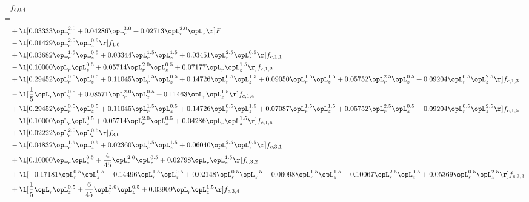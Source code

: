 \begin{alignat}{2} 
\label{eq:f_04_2} 
& f_{c,0,4} \nonumber \\ 
 = \\ 
& + \l[  0.03333 \opL_r^{2.0} +  0.04286 \opL_r^{3.0} +  0.02713 \opL_r^{2.0} \opL_z  \r] F \nonumber \\ 
& - \l[  0.01429 \opL_r^{2.0} \opL_z^{0.5}  \r] f_{1,0} \nonumber \\ 
& + \l[  0.03682 \opL_r^{1.5} \opL_z^{0.5} +  0.03344 \opL_r^{1.5} \opL_z^{1.5} +  0.03451 \opL_r^{2.5} \opL_z^{0.5}  \r] f_{c,1,1} \nonumber \\ 
& - \l[  0.10000 \opL_r \opL_z^{0.5} +  0.05714 \opL_r^{2.0} \opL_z^{0.5} +  0.07177 \opL_r \opL_z^{1.5}  \r] f_{c,1,2} \nonumber \\ 
& + \l[  0.29452 \opL_r^{0.5} \opL_z^{0.5} +  0.11045 \opL_r^{1.5} \opL_z^{0.5} +  0.14726 \opL_r^{0.5} \opL_z^{1.5} +  0.09050 \opL_r^{1.5} \opL_z^{1.5} +  0.05752 \opL_r^{2.5} \opL_z^{0.5} +  0.09204 \opL_r^{0.5} \opL_z^{2.5}  \r] f_{c,1,3} \nonumber \\ 
& - \l[ \frac{1}{5} \opL_r \opL_z^{0.5} +  0.08571 \opL_r^{2.0} \opL_z^{0.5} +  0.11463 \opL_r \opL_z^{1.5}  \r] f_{c,1,4} \nonumber \\ 
& + \l[  0.29452 \opL_r^{0.5} \opL_z^{0.5} +  0.11045 \opL_r^{1.5} \opL_z^{0.5} +  0.14726 \opL_r^{0.5} \opL_z^{1.5} +  0.07087 \opL_r^{1.5} \opL_z^{1.5} +  0.05752 \opL_r^{2.5} \opL_z^{0.5} +  0.09204 \opL_r^{0.5} \opL_z^{2.5}  \r] f_{c,1,5} \nonumber \\ 
& - \l[  0.10000 \opL_r \opL_z^{0.5} +  0.05714 \opL_r^{2.0} \opL_z^{0.5} +  0.04286 \opL_r \opL_z^{1.5}  \r] f_{c,1,6} \nonumber \\ 
& + \l[  0.02222 \opL_r^{2.0} \opL_z^{0.5}  \r] f_{3,0} \nonumber \\ 
& - \l[  0.04832 \opL_r^{1.5} \opL_z^{0.5} +  0.02360 \opL_r^{1.5} \opL_z^{1.5} +  0.06040 \opL_r^{2.5} \opL_z^{0.5}  \r] f_{c,3,1} \nonumber \\ 
& + \l[  0.10000 \opL_r \opL_z^{0.5} + \frac{4}{45} \opL_r^{2.0} \opL_z^{0.5} +  0.02798 \opL_r \opL_z^{1.5}  \r] f_{c,3,2} \nonumber \\ 
& + \l[  -0.17181 \opL_r^{0.5} \opL_z^{0.5}   -0.14496 \opL_r^{1.5} \opL_z^{0.5} +  0.02148 \opL_r^{0.5} \opL_z^{1.5}   -0.06098 \opL_r^{1.5} \opL_z^{1.5}   -0.10067 \opL_r^{2.5} \opL_z^{0.5} +  0.05369 \opL_r^{0.5} \opL_z^{2.5}  \r] f_{c,3,3} \nonumber \\ 
& + \l[ \frac{1}{5} \opL_r \opL_z^{0.5} + \frac{6}{45} \opL_r^{2.0} \opL_z^{0.5} +  0.03909 \opL_r \opL_z^{1.5}  \r] f_{c,3,4} \nonumber \\ 

\end{alignat}
